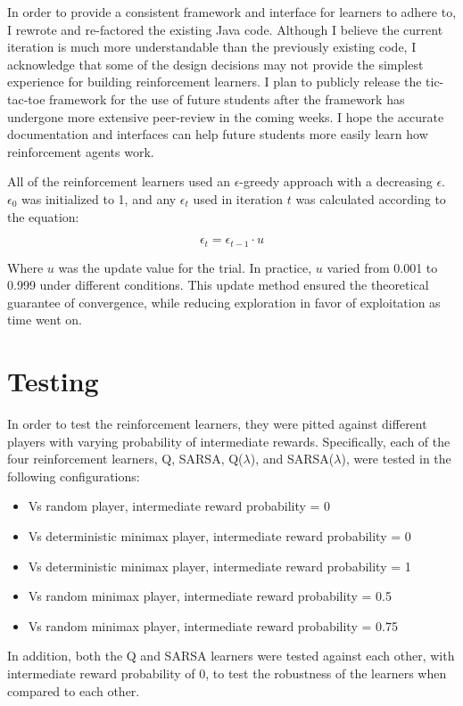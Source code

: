 \documentclass{article}
\begin{document}
In order to provide a consistent framework and interface for learners to adhere to, I rewrote and re-factored the existing Java code. Although I believe the current iteration is much more understandable than the previously existing code, I acknowledge that some of the design decisions may not provide the simplest experience for building reinforcement learners. I plan to publicly release the tic-tac-toe framework for the use of future students after the framework has undergone more extensive peer-review in the coming weeks. I hope the accurate documentation and interfaces can help future students more easily learn how reinforcement agents work.

All of the reinforcement learners used an $\epsilon$-greedy approach with a decreasing $\epsilon$. $\epsilon_0$ was initialized to 1, and any $\epsilon_t$ used in iteration $t$ was calculated according to the equation:

$$\epsilon_t = \epsilon_{t - 1} \cdot u$$

Where $u$ was the update value for the trial. In practice, $u$ varied from 0.001 to 0.999 under different conditions. This update method ensured the theoretical guarantee of convergence, while reducing exploration in favor of exploitation as time went on.

\section{Testing}

In order to test the reinforcement learners, they were pitted against different players with varying probability of intermediate rewards. Specifically, each of the four reinforcement learners, Q, SARSA, Q($\lambda$), and SARSA($\lambda$), were tested in the following configurations:

\begin{itemize}
\item Vs random player, intermediate reward probability = 0
\item Vs deterministic minimax player, intermediate reward probability = 0
\item Vs deterministic minimax player, intermediate reward probability = 1
\item Vs random minimax player, intermediate reward probability = 0.5
\item Vs random minimax player, intermediate reward probability = 0.75
\end{itemize}

In addition, both the Q and SARSA learners were tested against each other, with intermediate reward probability of 0, to test the robustness of the learners when compared to each other.
\end{document}
